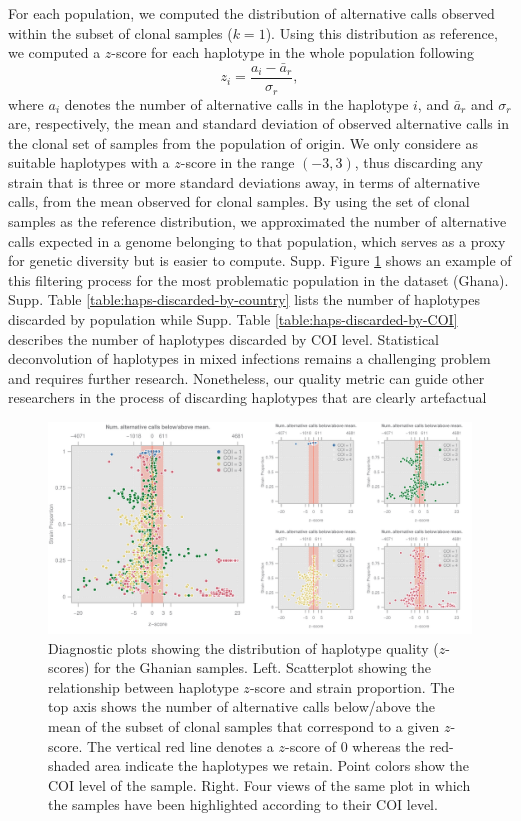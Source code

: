 \documentclass[9pt]{article}
\begin{document}
For each population, we computed the distribution of alternative calls observed within the subset of clonal samples ($k=1$). Using this distribution as reference, we computed a $z$-score for each haplotype in the whole population following $$z_i = \frac{a_i - \bar{a}_r}{\sigma_r},$$ where $a_i$ denotes the number of alternative calls in the haplotype $i$, and $\bar{a}_r$ and $\sigma_r$ are, respectively, the mean and standard deviation of observed alternative calls in the clonal set of samples from the population of origin. We only considere as suitable haplotypes with a $z$-score in the range $(-3,3)$, thus discarding any strain that is three or more standard deviations away, in terms of alternative calls, from the mean observed for clonal samples. By using the set of clonal samples as the reference distribution, we approximated the number of alternative calls expected in a genome belonging to that population, which serves as a proxy for genetic diversity but is easier to compute. Supp. Figure \ref{fig:ghana-filtering} shows an example of this filtering process for the most problematic population in the dataset (Ghana). Supp. Table \ref{table:haps-discarded-by-country} lists the number of haplotypes discarded by population while Supp. Table \ref{table:haps-discarded-by-COI} describes the number of haplotypes discarded by COI level. Statistical deconvolution of haplotypes in mixed infections remains a challenging problem and requires further research. Nonetheless, our quality metric can guide other researchers in the process of discarding haplotypes that are clearly artefactual

\begin{figure}[ht]
  \centering
    \includegraphics[width=1\textwidth]{figures/qualityGhana.pdf}
  \caption{Diagnostic plots showing the distribution of haplotype quality ($z$-scores) for the Ghanian samples. Left. Scatterplot showing the relationship between haplotype $z$-score and strain proportion. The top axis shows the number of alternative calls below/above the mean of the subset of clonal samples that correspond to a given $z$-score. The vertical red line denotes a $z$-score of $0$ whereas the red-shaded area indicate the haplotypes we retain. Point colors show the COI level of the sample. Right. Four views of the same plot in which the samples have been highlighted according to their COI level.}
    \label{fig:ghana-filtering}
\end{figure}
\end{document}
